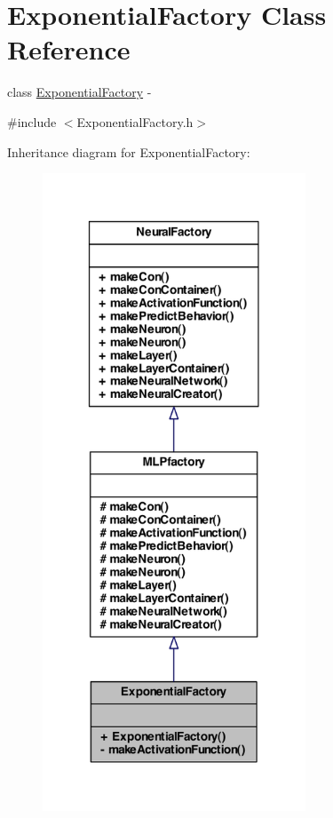 \hypertarget{class_exponential_factory}{
\section{ExponentialFactory Class Reference}
\label{class_exponential_factory}
}


class \hyperlink{class_exponential_factory}{ExponentialFactory} -\/  




{\ttfamily \#include $<$ExponentialFactory.h$>$}



Inheritance diagram for ExponentialFactory:\nopagebreak
\begin{figure}[H]
\begin{center}
\leavevmode
\includegraphics[width=222pt]{class_exponential_factory__inherit__graph}
\end{center}
\end{figure}


